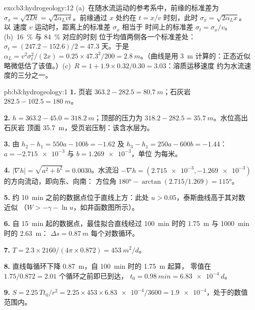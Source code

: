 \begin{solution}{exo:b3:hydrogeology:12}
(a)~在随水流运动的参考系中，前缘的标准差为
$\sigma_x = \sqrt{2Dt} = \sqrt{2\alpha_Lvt}$。前缘通过
$x$ 处约在 $t = x/v$ 时刻，此时 $\sigma_x = \sqrt{2\alpha_Lx}$。以
速度 $v$ 运动时，距离上的标准差 $\sigma_x$ 相当于
时间上的标准差 $\sigma_t = \sigma_x/v$。(b)~\qty{16}{\percent} 与 \qty{84}{\percent} 对应的时刻
位于均值两侧各一个标准差处：$\sigma_t = (247.2 -
152.6)/2 = \num{47.3}\text{ 天}$。于是 $\alpha_L = v^2\sigma_t^2/(2x) =
0.25\times47.3^2/200 = \qty{2.8}{m}$。（曲线是用
\qty{3}{m} 计算的：正态近似略微低估了该值。）(c)~$R =
1 + 1.9\times0.32/0.30 = \num{3.03}$：溶质运移速度
约为水流速度的三分之一。
\end{solution}

\begin{solution}{pb:b3:hydrogeology:1}
\textbf{1.} 页岩 $363.2 - 282.5 = \qty{80.7}{m}$；石灰岩 $282.5 -
102.5 = \qty{180}{m}$。

\textbf{2.} $h = 363.2 - 45.0 = \qty{318.2}{m}$；顶部的压力为
$318.2 - 282.5 = \qty{35.7}{m}$。水位高出石灰岩
顶面 \qty{35.7}{m}，受页岩压制：该含水层为。

\textbf{3.} 由 $h_2 - h_1 = 550a - 100b = -1.62$ 及 $h_3 - h_1 = 250a
- 600b = -1.44$：$a = \num{-2.715e-3}$ 与 $b = \num{1.269e-3}$，单位
为每米。

\textbf{4.} $|\nabla h| = \sqrt{a^2 + b^2} = \num{0.0030}$。水流沿
$-\nabla h = (\num{2.715e-3}, \num{-1.269e-3})$ 的方向流动，即向东、向南：
方位角 $\ang{180} - \arctan(2.715/1.269) = \ang{115}$。

\textbf{5.} 约 \qty{10}{min} 之前的数据点位于直线上方：此处
$u > 0.05$，泰斯曲线高于其对数近似
（$W > -\gamma - \ln u$，如井函数图所示）。

\textbf{6.} 自 \qty{15}{min} 起的数据点，最佳拟合直线经过
\qty{100}{min} 时的 \qty{1.75}{m} 与 \qty{1000}{min} 时的 \qty{2.63}{m}：
$\Delta s = \qty{0.87}{m}$ 每个对数循环。

\textbf{7.} $T = 2.3\times2160/(4\pi\times0.872) = \qty{453}{m^2/d}$。

\textbf{8.} 直线每循环下降 \qty{0.87}{m}，自 \qty{100}{min} 时的 \qty{1.75}{m} 起算，
零值在 $1.75/0.872 = 2.01$ 个循环之前即已到达，
$t_0 = \qty{0.98}{min} = \qty{6.83e-4}{d}$。

\textbf{9.} $S = 2.25\,Tt_0/r^2 = 2.25\times453\times\num{6.83e-4}/3600 =
\num{1.9e-4}$，处于的数值范围内。


\end{solution}
